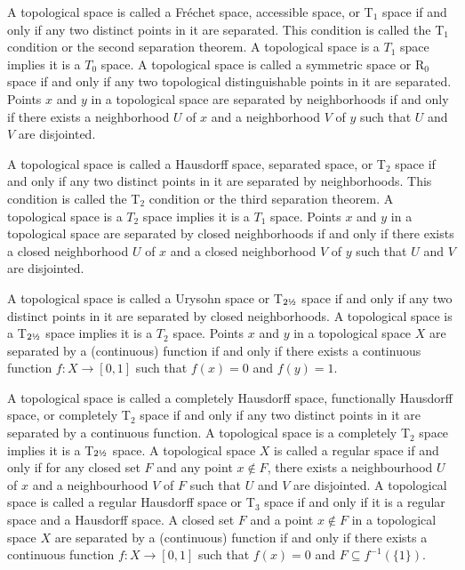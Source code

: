\documentclass[a4paper,12pt]{article}
\begin{document}
A topological space is called a Fréchet space, accessible space, or T$_1$ space if and only if any two distinct points in it are separated. This condition is called the T$_1$ condition or the second separation theorem. A topological space is a $T_1$ space implies it is a $T_0$ space.
A topological space is called a symmetric space or R$_0$ space if and only if any two topological distinguishable points in it are separated.
Points $x$ and $y$ in a topological space are separated by neighborhoods if and only if there exists a neighborhood $U$ of $x$ and a neighborhood $V$ of $y$ such that $U$ and $V$ are disjointed.

A topological space is called a Hausdorff space, separated space, or T$_2$ space if and only if any two distinct points in it are separated by neighborhoods. This condition is called the T$_2$ condition or the third separation theorem. A topological space is a $T_2$ space implies it is a $T_1$ space.
Points $x$ and $y$ in a topological space are separated by closed neighborhoods if and only if there exists a closed neighborhood $U$ of $x$ and a closed neighborhood $V$ of $y$ such that $U$ and $V$ are disjointed.

A topological space is called a Urysohn space or T\(_{2\text{\textonehalf}}\) space if and only if any two distinct points in it are separated by closed neighborhoods. A topological space is a T\(_{2\text{\textonehalf}}\) space implies it is a $T_2$ space.
Points $x$ and $y$ in a topological space $X$ are separated by a (continuous) function if and only if there exists a continuous function $f\colon X\to [0,1]$ such that $f(x)=0$ and $f(y)=1$.

A topological space is called a completely Hausdorff space, functionally Hausdorff space, or completely T$_2$ space if and only if any two distinct points in it are separated by a continuous function. A topological space is a completely T$_2$ space implies it is a T\(_{2\text{\textonehalf}}\) space.
A topological space $X$ is called a regular space if and only if for any closed set $F$ and any point $x\notin F$, there exists a neighbourhood $U$ of $x$ and a neighbourhood $V$ of $F$ such that $U$ and $V$ are disjointed.
A topological space is called a regular Hausdorff space or T$_3$ space if and only if it is a regular space and a Hausdorff space.
A closed set $F$ and a point $x\notin F$ in a topological space $X$ are separated by a (continuous) function if and only if there exists a continuous function $f\colon X\to [0,1]$ such that $f(x)=0$ and $F\subseteq f^{-1}(\{1\})$.
\end{document}

